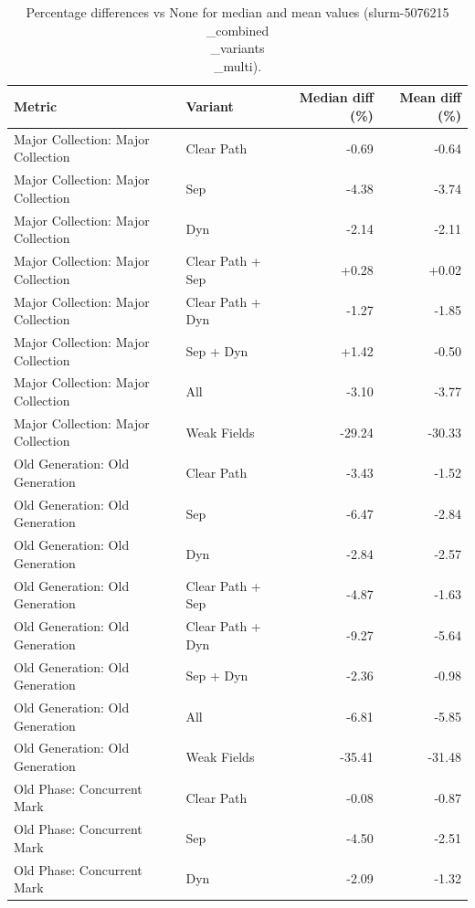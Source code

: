 \begin{table}[t]
\centering
\caption{Percentage differences vs None for median and mean values (slurm-5076215\\_combined\\_variants\\_multi).}
\label{tab:gc_metric_pct_diff_slurm-5076215\\_combined\\_variants\\_multi}
\begin{tabular}{llrr}
\toprule
Metric & Variant & Median diff (\%) & Mean diff (\%) \\
\midrule
Major Collection: Major Collection & Clear Path & -0.69 & -0.64 \\
Major Collection: Major Collection & Sep & -4.38 & -3.74 \\
Major Collection: Major Collection & Dyn & -2.14 & -2.11 \\
Major Collection: Major Collection & Clear Path + Sep & +0.28 & +0.02 \\
Major Collection: Major Collection & Clear Path + Dyn & -1.27 & -1.85 \\
Major Collection: Major Collection & Sep + Dyn & +1.42 & -0.50 \\
Major Collection: Major Collection & All & -3.10 & -3.77 \\
Major Collection: Major Collection & Weak Fields & -29.24 & -30.33 \\
Old Generation: Old Generation & Clear Path & -3.43 & -1.52 \\
Old Generation: Old Generation & Sep & -6.47 & -2.84 \\
Old Generation: Old Generation & Dyn & -2.84 & -2.57 \\
Old Generation: Old Generation & Clear Path + Sep & -4.87 & -1.63 \\
Old Generation: Old Generation & Clear Path + Dyn & -9.27 & -5.64 \\
Old Generation: Old Generation & Sep + Dyn & -2.36 & -0.98 \\
Old Generation: Old Generation & All & -6.81 & -5.85 \\
Old Generation: Old Generation & Weak Fields & -35.41 & -31.48 \\
Old Phase: Concurrent Mark & Clear Path & -0.08 & -0.87 \\
Old Phase: Concurrent Mark & Sep & -4.50 & -2.51 \\
Old Phase: Concurrent Mark & Dyn & -2.09 & -1.32 \\

\end{tabular}
\end{table}
